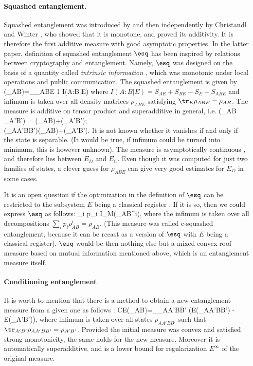 \documentclass[twocolumn,aps,rmp]{revtex4}
\begin{document}
\paragraph{Squashed entanglement.}
Squashed entanglement was introduced by  \cite{Tucci2002-squashed}
and then independently by Christandl and Winter
\cite{Winter-squashed-ent}, who showed that it is monotone, and
proved its additivity. It is therefore the  first additive measure
with good asymptotic properties. In the latter paper, definition of squashed
entanglement $\esq$ has been inspired by relations between
cryptography and entanglement. Namely, $\esq$ was designed on the
basis of a quantity called {\it intrinsic information}
\cite{MauWol97c-intr,GisinWolf_linking,renner-wolf-gap}, which was
monotonic under local operations and public communication. The
squashed entanglement is given by \be
\esq(\rho_{AB})=\inf_{\rho_{ABE}} {1} I(A:B|E) \ee
where $I(A:B|E)= S_{AE}+S_{BE}-S_E - S_{ABE}$ and infimum is
taken over all density matrices $\rho_{ABE}$ satisfying $\tr_E
\rho_{ABE}=\rho_{AB}$. The measure is additive on tensor product
and superadditive in general, i.e. \ben
\esq(\rho_{AB} \ot \rho_{A'B'}) = \esq(\rho_{AB})+\esq(\rho_{A'B'});\quad \nonumber\\
\esq(\rho_{AA'BB'})\geq  \esq(\rho_{AB})+\esq(\rho_{A'B'}). \een
It is not known whether it vanishes if and only if the state
is separable. (It would be true, if infimum could be turned into
minimum, this is however unknown). The measure is asymptotically
continuous \cite{Alicki-Fannes}, and therefore lies between $E_D$
and $E_C$.  Even though it was computed for just two families of
states, a clever guess for $\rho_{ABE}$ can give very good estimates
for $E_D$ in some cases.


It is an open question if the optimization in the definition of
$\esq$ can be restricted to the subsystem $E$ being a classical
register \cite{Tucci2002-squashed}. If it is so, then we could
express $\esq$ as follows: \be \esq{}\inf \sum_i p_i
I_M(\rho_{AB}^i), \ee where the infimum is taken over all
decompositions $\sum_i p_i \rho^i_{AB} =\rho_{AB}$. (This measure was  called c-squashed entanglement, because it can be recast as a version of $\esq$ with  $E$ being a classical register). $\esq$ would be then
nothing else but a mixed convex roof measure based on mutual information mentioned above, which is an entanglement measure itself.

\paragraph{Conditioning entanglement}
It is worth to mention that there is a method to obtain a new entanglement measure from a given one as follows \cite{DongHW2007-cond-ent}:
\be
CE(\rho_{AB})=\inf_{\rho_{AA'BB'}} (E(\rho_{AA'BB'}) - E(\rho_{A'B'})),
\ee
where infimum is taken over all states $\rho_{AA'BB'}$ such that $\tr_{A'B'}\rho_{AA'BB'}=\rho_{A'B'}$.
Provided the initial measure was convex and satisfied strong monotonicity,
the same holds for the new measure. Moreover it is automatically superadditive, and is a lower bound for regularization $E^{\infty}$ of the original measure.
\end{document}
